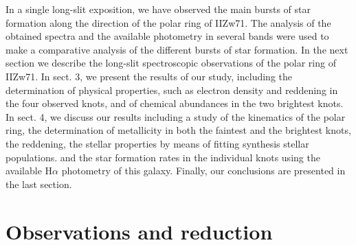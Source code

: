 \documentclass[structabstract]{aa}
\begin{document}
In a single long-slit exposition, we have observed the main bursts of star formation along the direction of the polar ring of IIZw71.
The analysis of the obtained spectra and the available 
photometry in several bands were used to make a comparative analysis of 
the different bursts of star formation. In the next section we describe the long-slit spectroscopic
observations of the polar ring of IIZw71.  In sect. 3, we present the results of our study, including
the determination of physical properties, such as electron density and reddening in the four observed knots,
and of chemical abundances in the two brightest knots. In sect. 4, we discuss 
our results including a study of the kinematics of the polar ring, the determination of metallicity in both
the faintest and the brightest knots, the reddening,
the stellar properties by means of fitting synthesis stellar populations. and the star formation rates in
the individual knots using the available H$\alpha$ photometry of this galaxy.
Finally, our conclusions are presented in the last section.

\section{Observations and reduction}

\end{document}
